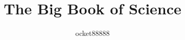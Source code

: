 
\title{The Big Book of Science}  %
\author{ocket88888}

\renewcommand{\lsISBN}{978-0-000000-00-0}                     
\renewcommand{\lsSeries}{dummyseries} %
\renewcommand{\lsSeriesNumber}{99} %
\renewcommand{\lsURL}{http://langsci-press.org/catalog/book/00} %
